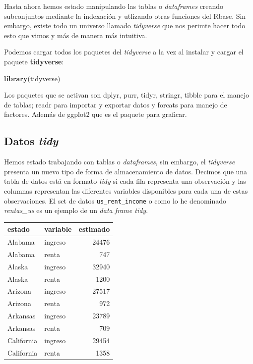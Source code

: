 \documentclass[
]{book}
\newenvironment{Shaded}{\begin{snugshade}}{\end{snugshade}}
\newcommand{\FunctionTok}[1]{\textcolor[rgb]{0.13,0.29,0.53}{\textbf{#1}}}
\newcommand{\NormalTok}[1]{#1}
\begin{document}
Hasta ahora hemos estado manipulando las tablas o \emph{dataframes} creando subconjuntos mediante la indexación y utlizando otras funciones del Rbase.
Sin embargo, existe todo un universo llamado \emph{tidyverse} que nos perimte hacer todo esto que vimos y más de manera más intuitiva.

Podemos cargar todos los paquetes del \emph{tidyverse} a la vez al instalar y cargar el paquete \textbf{tidyverse}:

\begin{Shaded}
\begin{Highlighting}[]
\FunctionTok{library}\NormalTok{(tidyverse)}
\end{Highlighting}
\end{Shaded}

Los paquetes que se activan son dplyr, purr, tidyr, stringr, tibble para el manejo de tablas; readr para importar y exportar datos y forcats para manejo de factores.
Además de ggplot2 que es el paquete para graficar.

\subsection{\texorpdfstring{Datos \emph{tidy}}{Datos tidy}}\label{datos-tidy}

Hemos estado trabajando con tablas o \emph{dataframes}, sin embargo, el \emph{tidyverse} presenta un nuevo tipo de forma de almacenamiento de datos.
Decimos que una tabla de datos está en formato \emph{tidy} si cada fila representa una observación y las columnas representan las diferentes variables disponibles para cada una de estas observaciones.
El set de datos \texttt{us\_rent\_income} o como lo he denominado \emph{rentas\_us} es un ejemplo de un \emph{data frame tidy}.

\begin{tabular}{l|l|r}
\hline
estado & variable & estimado\\
\hline
Alabama & ingreso & 24476\\
\hline
Alabama & renta & 747\\
\hline
Alaska & ingreso & 32940\\
\hline
Alaska & renta & 1200\\
\hline
Arizona & ingreso & 27517\\
\hline
Arizona & renta & 972\\
\hline
Arkansas & ingreso & 23789\\
\hline
Arkansas & renta & 709\\
\hline
California & ingreso & 29454\\
\hline
California & renta & 1358\\
\hline
\end{tabular}
\end{document}
